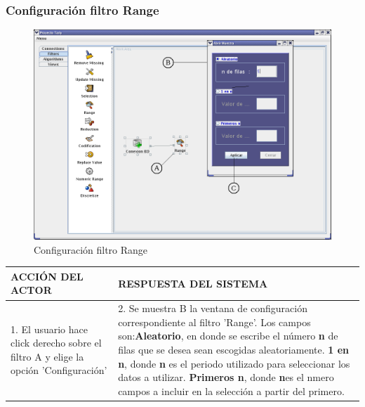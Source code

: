 \subsubsection{Configuraci\'on filtro Range}
\begin{figure}[ht]
\centering
\includegraphics[width=1\textwidth]{images/fi4.png}
\caption{Configuraci\'on filtro Range}
\end{figure}
\begin{center}
\begin{tabular}{|p{60mm}|p{60mm}|} \hline
ACCI\'ON DEL ACTOR & RESPUESTA DEL SISTEMA \\ \hline
1. El usuario hace click derecho sobre el filtro A y elige la opci\'on 'Configuraci\'on'& 2. Se muestra B la ventana de configuraci\'on correspondiente al filtro 'Range'. Los campos son:\textbf{Aleatorio}, en donde se escribe el n\'umero \textbf{n} de filas que se desea sean escogidas aleatoriamente. \textbf{1 en n}, donde \textbf{n} es el periodo utilizado para seleccionar los datos a utilizar. \textbf{Primeros n}, donde \textbf{n}es el nmero campos a incluir en la selecci\'on a partir del primero. \\ \hline
\end{tabular}
\end{center}

\newpage
